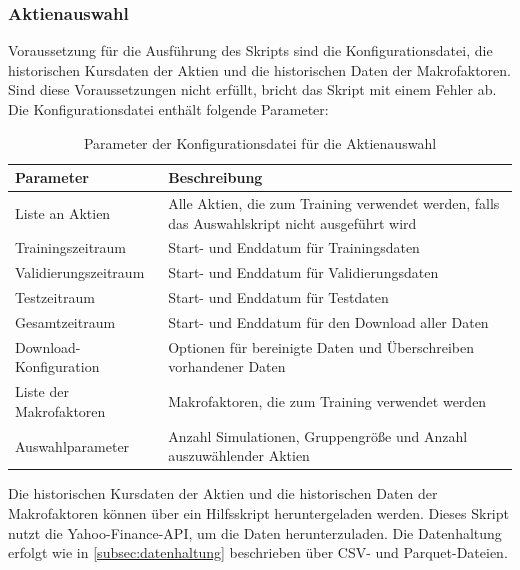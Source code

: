 \subsubsection{Aktienauswahl}\label{subsubsec:aktienauswahl}
Voraussetzung für die Ausführung des Skripts sind die Konfigurationsdatei, die historischen Kursdaten der Aktien und die historischen Daten der Makrofaktoren. Sind diese Voraussetzungen nicht erfüllt, bricht das Skript mit einem Fehler ab. Die Konfigurationsdatei enthält folgende Parameter:

\begin{table}[h!]
    \centering
    \small
    \begin{tabular}{p{5cm}p{9cm}}
        \toprule
        \textbf{Parameter} & \textbf{Beschreibung} \\
        \midrule
        Liste an Aktien & Alle Aktien, die zum Training verwendet werden, falls das Auswahlskript nicht ausgeführt wird \\
        \addlinespace
        Trainingszeitraum & Start- und Enddatum für Trainingsdaten \\
        \addlinespace
        Validierungszeitraum & Start- und Enddatum für Validierungsdaten \\
        \addlinespace
        Testzeitraum & Start- und Enddatum für Testdaten \\
        \addlinespace
        Gesamtzeitraum & Start- und Enddatum für den Download aller Daten \\
        \addlinespace
        Download-Konfiguration & Optionen für bereinigte Daten und Überschreiben vorhandener Daten \\
        \addlinespace
        Liste der Makrofaktoren & Makrofaktoren, die zum Training verwendet werden \\
        \addlinespace
        Auswahlparameter & Anzahl Simulationen, Gruppengröße und Anzahl auszuwählender Aktien \\
        \bottomrule
    \end{tabular}
    \caption{Parameter der Konfigurationsdatei für die Aktienauswahl}
    \label{tab:config_params}
\end{table}

Die historischen Kursdaten der Aktien und die historischen Daten der Makrofaktoren können über ein Hilfsskript heruntergeladen werden. Dieses Skript nutzt die Yahoo-Finance-API, um die Daten herunterzuladen. Die Datenhaltung erfolgt wie in \cref{subsec:datenhaltung} beschrieben über CSV- und Parquet-Dateien.

